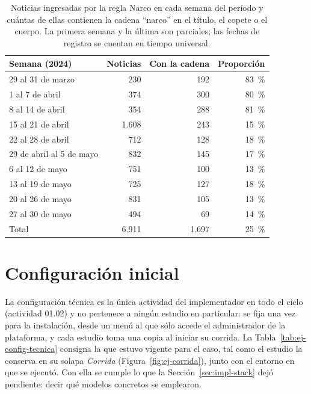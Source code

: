 \documentclass[12pt]{report}
\begin{document}
\begin{table}[H]
  \centering
  \footnotesize
  \caption{Noticias ingresadas por la regla Narco en cada semana del período y cuántas de ellas contienen la cadena ``narco'' en el título, el copete o el cuerpo. La primera semana y la última son parciales; las fechas de registro se cuentan en tiempo universal.}
  \label{tab:ej-regla-semanal}
  \begin{tabular}{@{}l r r r@{}}
    \toprule
    \textbf{Semana (2024)}   & \textbf{Noticias} & \textbf{Con la cadena} & \textbf{Proporción} \\
    \midrule
    29 al 31 de marzo        & 230               & 192                    & 83~\%               \\
    1 al 7 de abril          & 374               & 300                    & 80~\%               \\
    8 al 14 de abril         & 354               & 288                    & 81~\%               \\
    15 al 21 de abril        & 1.608             & 243                    & 15~\%               \\
    22 al 28 de abril        & 712               & 128                    & 18~\%               \\
    29 de abril al 5 de mayo & 832               & 145                    & 17~\%               \\
    6 al 12 de mayo          & 751               & 100                    & 13~\%               \\
    13 al 19 de mayo         & 725               & 127                    & 18~\%               \\
    20 al 26 de mayo         & 831               & 105                    & 13~\%               \\
    27 al 30 de mayo         & 494               & 69                     & 14~\%               \\
    \midrule
    Total                    & 6.911             & 1.697                  & 25~\%               \\
    \bottomrule
  \end{tabular}
\end{table}

\section{Configuración inicial}
\label{sec:ej-configuracion}

La configuración técnica es la única actividad del implementador en todo el ciclo (actividad 01.02) y no pertenece a ningún estudio en particular: se fija una vez para la instalación, desde un menú al que sólo accede el administrador de la plataforma, y cada estudio toma una copia al iniciar su corrida. La Tabla~\ref{tab:ej-config-tecnica} consigna la que estuvo vigente para el caso, tal como el estudio la conserva en su solapa \textit{Corrida} (Figura~\ref{fig:ej-corrida}), junto con el entorno en que se ejecutó. Con ella se cumple lo que la Sección~\ref{sec:impl-stack} dejó pendiente: decir qué modelos concretos se emplearon.
\end{document}
